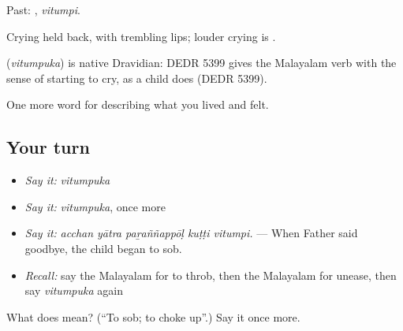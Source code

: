 Past: , \emph{vitumpi}.

Crying held back, with trembling lips; louder crying is .

\begin{cousinweb}
\textbf{} (\emph{vitumpuka}) is native Dravidian: DEDR 5399 gives the Malayalam verb with the sense of starting to cry, as a child does (DEDR 5399).
\end{cousinweb}

\begin{grammarlens}[title={What you've built}]
One more word for describing what you lived and felt.
\end{grammarlens}

\subsection*{Your turn}
\begin{itemize}
\raggedright
  \item \emph{Say it:} \emph{vitumpuka}
  \item \emph{Say it:} \emph{vitumpuka}, once more
  \item \emph{Say it:} \emph{acchan yātra paṟaññappōḷ kuṭṭi vitumpi.} — When Father said goodbye, the child began to sob.
  \item \emph{Recall:} say the Malayalam for to throb, then the Malayalam for unease, then say \emph{vitumpuka} again
\end{itemize}

\begin{tcolorbox}[breakable,colback=teal!4,colframe=teal!35!black,title={Before you move on}]
What does  mean? (\textquotedblleft{}To sob; to choke up\textquotedblright{}.) Say it once more.
\end{tcolorbox}
